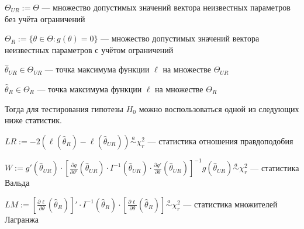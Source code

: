 $\Theta_{UR} := \Theta$ — множество допустимых значений вектора неизвестных параметров без учёта ограничений

$\Theta_{R} := \{ \theta \in \Theta: g(\theta) = 0\}$ — множество допустимых значений вектора неизвестных параметров с учётом ограничений

$\hat{\theta}_{UR} \in \Theta_{UR}$ — точка максимума функции $\ell$ на множестве $\Theta_{UR}$

$\hat{\theta}_{R} \in \Theta_{R}$ — точка максимума функции $\ell$ на множестве $\Theta_{R}$

Тогда для тестирования гипотезы $H_0$ можно воспользоваться одной из следующих ниже статистик.

$LR := -2(\ell(\hat{\theta}_{R}) - \ell(\hat{\theta}_{UR})) \overset{a}{\sim} \chi^2_r$ — статистика отношения правдоподобия

$W := g'(\hat{\theta}_{UR}) \cdot \left[ \frac{\partial g}{\partial \theta'}(\hat{\theta}_{UR}) \cdot I^{-1}(\hat{\theta}_{UR}) \cdot \frac{\partial g'}{\partial \theta}(\hat{\theta}_{UR}) \right]^{-1} g(\hat{\theta}_{UR}) \overset{a}{\sim} \chi^2_r$ — статистика Вальда

$LM := \left[ \frac{\partial \ell}{\partial \theta}(\hat{\theta}_{R}) \right]' \cdot I^{-1}(\hat{\theta}_{R}) \cdot \left[ \frac{\partial \ell}{\partial \theta}(\hat{\theta}_{R}) \right] \overset{a}{\sim} \chi^2_r$ — статистика множителей Лагранжа



